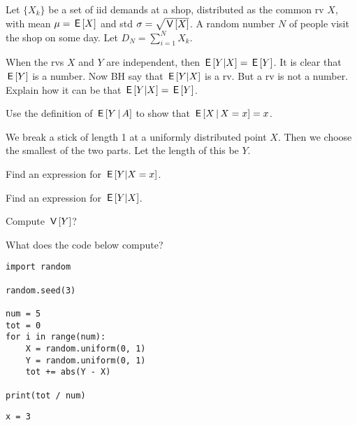 Let $\{X_{k}\}$ be a set of iid demands at a shop, distributed as the common rv $X$, with mean $\mu = \,\mathsf{E}\left[X\right]$ and std $\sigma = \sqrt{\,\mathsf{V}\left[X\right]}$.  A random number $N$ of people visit the shop on some day. Let $D_{N} = \sum_{i=1}^{N} X_{k}$.

\begin{exercise}[1]
When the rvs $X$ and $Y$ are independent, then $\,\mathsf{E}\left[Y|X\right] = \,\mathsf{E}\left[Y\right]$.
It is clear that $\,\mathsf{E}\left[Y\right]$ is a number.
Now BH say that $\,\mathsf{E}\left[Y|X\right]$ is a rv.
But a rv is not a number. Explain how it can be that $\,\mathsf{E}\left[Y|X\right] = \,\mathsf{E}\left[Y\right]$.
\begin{solution}
\end{solution}
\end{exercise}

\begin{exercise}
Use the definition of $\,\mathsf{E}\left[Y\,\middle|\, A\right]$ to show that $\,\mathsf{E}\left[X\,\middle|\, X=x\right] = x$.
\begin{solution}
  \end{solution}
\end{exercise}




We break a stick of length 1 at a uniformly distributed point $X$. Then we choose the smallest of the two parts. Let the length of this be $Y$.

\begin{exercise}[1]
Find an expression for $\,\mathsf{E}\left[Y|X=x\right]$.
\begin{solution}
\end{solution}
\end{exercise}

\begin{exercise}[0.5]
Find an expression for $\,\mathsf{E}\left[Y|X\right]$.
\begin{solution}
\end{solution}
\end{exercise}

\begin{exercise}[1.5]
Compute $\,\mathsf{V}\left[Y\right]$?
\begin{solution}
\end{solution}
\end{exercise}

\begin{exercise}[1]
What does the  code below compute?
\begin{solution}
\end{solution}

\begin{verbatim}
import random

random.seed(3)

num = 5
tot = 0
for i in range(num):
    X = random.uniform(0, 1)
    Y = random.uniform(0, 1)
    tot += abs(Y - X)

print(tot / num)
\end{verbatim}

\begin{verbatim}
x = 3
\end{verbatim}

\end{exercise}
